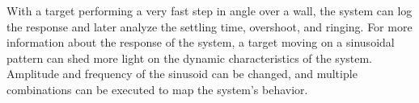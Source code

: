 With a target performing a very fast step in angle over a wall, the system can
log the response and later analyze the settling time, overshoot, and ringing.
For more information about the response of the system, a target moving on a
sinusoidal pattern can shed more light on the dynamic characteristics of the
system. Amplitude and frequency of the sinusoid can be changed, and multiple
combinations can be executed to map the system's behavior.